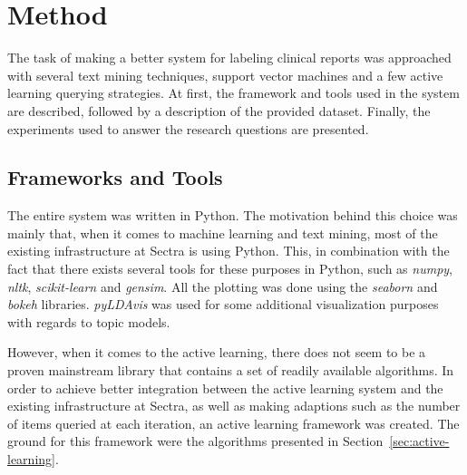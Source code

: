 \chapter{Method}
\label{cha:method}

%

The task of making a better system for labeling clinical reports was approached with several text mining techniques, support vector machines and a few active learning querying strategies.
At first, the framework and tools used in the system are described, followed by a description of the provided dataset.
Finally, the experiments used to answer the research questions are presented.

\section{Frameworks and Tools}
The entire system was written in Python.
The motivation behind this choice was mainly that, when it comes to machine learning and text mining, most of the existing infrastructure at Sectra is using Python.
This, in combination with the fact that there exists several tools for these purposes in Python, such as \textit{numpy}, \textit{nltk}, \textit{scikit-learn} and \textit{gensim}. %
All the plotting was done using the \textit{seaborn} and \textit{bokeh} libraries.
\textit{pyLDAvis} was used for some additional visualization purposes with regards to topic models.

However, when it comes to the active learning, there does not seem to be a proven mainstream library that contains a set of readily available algorithms.
In order to achieve better integration between the active learning system and the existing infrastructure at Sectra, as well as making adaptions such as the number of items queried at each iteration, an active learning framework was created.
The ground for this framework were the algorithms presented in Section~\ref{sec:active-learning}.

